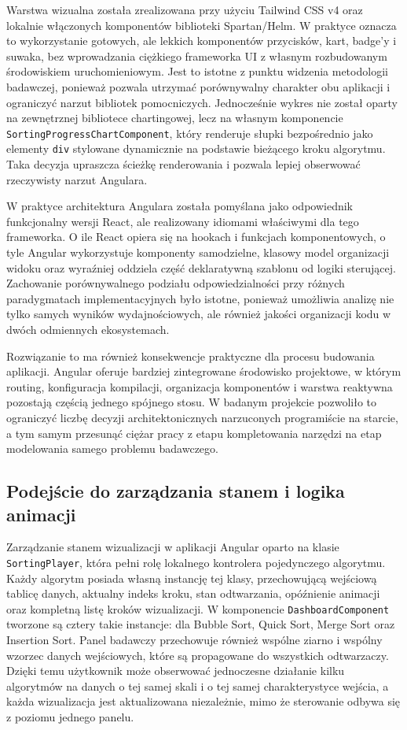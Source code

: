 \documentclass[12pt,openright,twoside]{report}
\begin{document}
Warstwa wizualna została zrealizowana przy użyciu Tailwind CSS v4 oraz lokalnie włączonych komponentów biblioteki Spartan/Helm. W praktyce oznacza to wykorzystanie gotowych, ale lekkich komponentów przycisków, kart, badge'y i suwaka, bez wprowadzania ciężkiego frameworka UI z własnym rozbudowanym środowiskiem uruchomieniowym. Jest to istotne z punktu widzenia metodologii badawczej, ponieważ pozwala utrzymać porównywalny charakter obu aplikacji i ograniczyć narzut bibliotek pomocniczych. Jednocześnie wykres nie został oparty na zewnętrznej bibliotece chartingowej, lecz na własnym komponencie \texttt{SortingProgressChartComponent}, który renderuje słupki bezpośrednio jako elementy \texttt{div} stylowane dynamicznie na podstawie bieżącego kroku algorytmu. Taka decyzja upraszcza ścieżkę renderowania i pozwala lepiej obserwować rzeczywisty narzut Angulara.

W praktyce architektura Angulara została pomyślana jako odpowiednik funkcjonalny wersji React, ale realizowany idiomami właściwymi dla tego frameworka. O ile React opiera się na hookach i funkcjach komponentowych, o tyle Angular wykorzystuje komponenty samodzielne, klasowy model organizacji widoku oraz wyraźniej oddziela część deklaratywną szablonu od logiki sterującej. Zachowanie porównywalnego podziału odpowiedzialności przy różnych paradygmatach implementacyjnych było istotne, ponieważ umożliwia analizę nie tylko samych wyników wydajnościowych, ale również jakości organizacji kodu w dwóch odmiennych ekosystemach.

Rozwiązanie to ma również konsekwencje praktyczne dla procesu budowania aplikacji. Angular oferuje bardziej zintegrowane środowisko projektowe, w którym routing, konfiguracja kompilacji, organizacja komponentów i warstwa reaktywna pozostają częścią jednego spójnego stosu. W badanym projekcie pozwoliło to ograniczyć liczbę decyzji architektonicznych narzuconych programiście na starcie, a tym samym przesunąć ciężar pracy z etapu kompletowania narzędzi na etap modelowania samego problemu badawczego.

\subsection{Podejście do zarządzania stanem i logika animacji}
Zarządzanie stanem wizualizacji w aplikacji Angular oparto na klasie \texttt{SortingPlayer}, która pełni rolę lokalnego kontrolera pojedynczego algorytmu. Każdy algorytm posiada własną instancję tej klasy, przechowującą wejściową tablicę danych, aktualny indeks kroku, stan odtwarzania, opóźnienie animacji oraz kompletną listę kroków wizualizacji. W komponencie \texttt{DashboardComponent} tworzone są cztery takie instancje: dla Bubble Sort, Quick Sort, Merge Sort oraz Insertion Sort. Panel badawczy przechowuje również wspólne ziarno i wspólny wzorzec danych wejściowych, które są propagowane do wszystkich odtwarzaczy. Dzięki temu użytkownik może obserwować jednoczesne działanie kilku algorytmów na danych o tej samej skali i o tej samej charakterystyce wejścia, a każda wizualizacja jest aktualizowana niezależnie, mimo że sterowanie odbywa się z poziomu jednego panelu.
\end{document}

